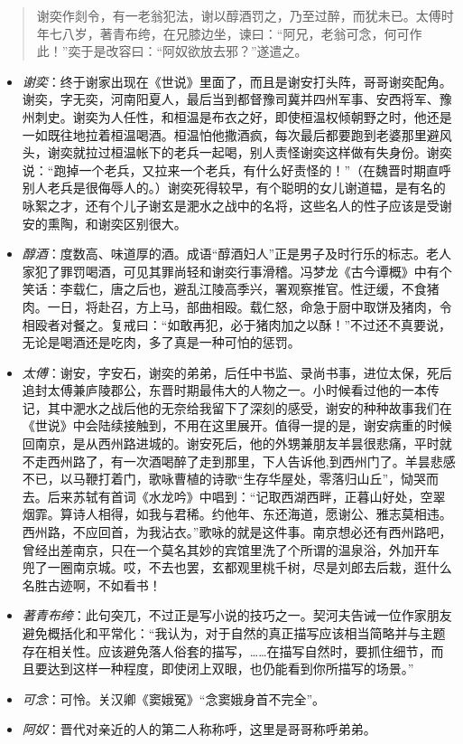\documentclass[]{book}
\providecommand{\tightlist}{%
  \setlength{\itemsep}{0pt}\setlength{\parskip}{0pt}}
\begin{document}
\begin{quote}
谢奕作剡令，有一老翁犯法，谢以醇酒罚之，乃至过醉，而犹未已。太傅时年七八岁，著青布绔，在兄膝边坐，谏曰：``阿兄，老翁可念，何可作此！''奕于是改容曰：``阿奴欲放去邪？''遂遣之。
\end{quote}

\begin{itemize}
\tightlist
\item
  \emph{谢奕}：终于谢家出现在《世说》里面了，而且是谢安打头阵，哥哥谢奕配角。谢奕，字无奕，河南阳夏人，最后当到都督豫司冀并四州军事、安西将军、豫州刺史。谢奕为人任性，和桓温是布衣之好，即使桓温权倾朝野之时，他还是一如既往地拉着桓温喝酒。桓温怕他撒酒疯，每次最后都要跑到老婆那里避风头，谢奕就拉过桓温帐下的老兵一起喝，别人责怪谢奕这样做有失身份。谢奕说：``跑掉一个老兵，又拉来一个老兵，有什么好责怪的！''（在魏晋时期直呼别人老兵是很侮辱人的。）谢奕死得较早，有个聪明的女儿谢道韫，是有名的咏絮之才，还有个儿子谢玄是淝水之战中的名将，这些名人的性子应该是受谢安的熏陶，和谢奕区别很大。
\item
  \emph{醇酒}：度数高、味道厚的酒。成语``醇酒妇人''正是男子及时行乐的标志。老人家犯了罪罚喝酒，可见其罪尚轻和谢奕行事滑稽。冯梦龙《古今谭概》中有个笑话：李载仁，唐之后也，避乱江陵高季兴，署观察推官。性迂缓，不食猪肉。一日，将赴召，方上马，部曲相殴。载仁怒，命急于厨中取饼及猪肉，令相殴者对餐之。复戒曰：``如敢再犯，必于猪肉加之以酥！''不过还不真要说，无论是喝酒还是吃肉，多了真是一种可怕的惩罚。
\item
  \emph{太傅}：谢安，字安石，谢奕的弟弟，后任中书监、录尚书事，进位太保，死后追封太傅兼庐陵郡公，东晋时期最伟大的人物之一。小时候看过他的一本传记，其中淝水之战后他的无奈给我留下了深刻的感受，谢安的种种故事我们在《世说》中会陆续接触到，不用在这里展开。值得一提的是，谢安病重的时候回南京，是从西州路进城的。谢安死后，他的外甥兼朋友羊昙很悲痛，平时就不走西州路了，有一次酒喝醉了走到那里，下人告诉他,到西州门了。羊昙悲感不已，以马鞭打着门，歌咏曹植的诗歌``生存华屋处，零落归山丘''，恸哭而去。后来苏轼有首词《水龙吟》中唱到：``记取西湖西畔，正暮山好处，空翠烟霏。算诗人相得，如我与君稀。约他年、东还海道，愿谢公、雅志莫相违。西州路，不应回首，为我沾衣。''歌咏的就是这件事。南京想必还有西州路吧，曾经出差南京，只在一个莫名其妙的宾馆里洗了个所谓的温泉浴，外加开车
  兜了一圈南京城。哎，不去也罢，玄都观里桃千树，尽是刘郎去后栽，逛什么名胜古迹啊，不如看书！
\item
  \emph{著青布绔}：此句突兀，不过正是写小说的技巧之一。契河夫告诫一位作家朋友避免概括化和平常化：``我认为，对于自然的真正描写应该相当简略并与主题存在相关性。应该避免落人俗套的描写，\ldots{}\ldots{}在描写自然时，要抓住细节，而且要达到这样一种程度，即使闭上双眼，也仍能看到你所描写的场景。''
\item
  \emph{可念}：可怜。关汉卿《窦娥冤》``念窦娥身首不完全''。
\item
  \emph{阿奴}：晋代对亲近的人的第二人称称呼，这里是哥哥称呼弟弟。
\end{itemize}
\end{document}
